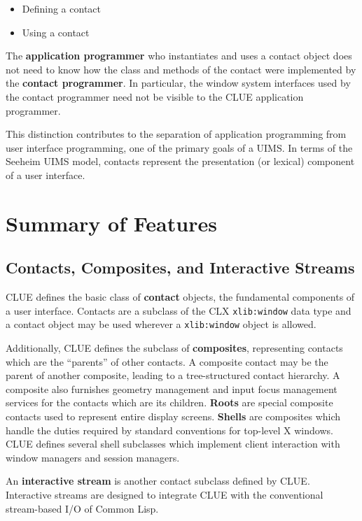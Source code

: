 \begin{itemize}
\item Defining a contact
\item Using a contact
\end{itemize} 
The {\bf application programmer} who
instantiates and uses a contact object does not need to know 
how the class and methods of the contact were implemented 
by the 
{\bf contact programmer}. 
In particular, the
window system interfaces used by the contact programmer need not be
visible to the CLUE application programmer. 

This distinction contributes to the separation of application
programming
from user interface programming, one of the primary goals of a
UIMS.
In terms of the Seeheim UIMS model\cite{pfaff-uims}, contacts represent
the presentation (or lexical) component of a user interface.

\section{Summary of Features}
\subsection{Contacts, Composites, and Interactive Streams}
CLUE defines the basic class of  {\bf contact} objects, the fundamental
components of a user interface. 
Contacts are a subclass of the CLX {\tt xlib:window} data type and a 
contact object may be used wherever a {\tt xlib:window} object is allowed. 

Additionally, CLUE defines the 
subclass of {\bf composites}, representing contacts which are the
``parents'' of other
contacts. A composite contact may be the parent of another composite,
leading to a tree-structured contact hierarchy. 
A composite also furnishes geometry management and input focus management
services for the contacts which are its children.
{\bf Roots} are special composite contacts used
to represent entire display screens. {\bf Shells} are composites
which handle the duties required by standard conventions for top-level
X windows\cite{icccm}. CLUE defines several
shell subclasses which implement
client interaction with window managers and session managers.

An {\bf interactive 
stream} is another contact subclass defined by CLUE. Interactive streams
are designed to integrate CLUE with the conventional stream-based I/O of
Common Lisp.

